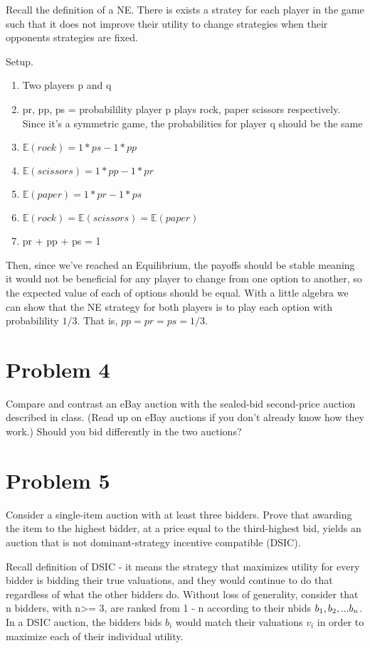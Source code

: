 \documentclass{article}
\begin{document}
Recall the definition of a NE.  There is exists a stratey for each player in
		the game such that it does not improve their utility to change
		strategies when their opponents strategies are fixed.

Setup.  
\begin{enumerate}
\item Two players p and q
\item pr, pp, ps = probabilility player p plays rock, paper scissors
	respectively.  Since it's a symmetric game, the probabilities for player q
		should be the same

\item$\mathbb{E}(rock) = 1*ps - 1*pp$
\item$\mathbb{E}(scissors) = 1*pp - 1*pr$
\item$\mathbb{E}(paper) = 1*pr - 1*ps$
\item$\mathbb{E}(rock) = \mathbb{E}(scissors) = \mathbb{E}(paper)$
\item pr + pp + ps = 1
\end{enumerate}

Then, since we've reached an Equilibrium, the payoffs should be stable meaning
it would not be beneficial for any player to change from one option to
another, so the expected value of each of options should be equal.  With a
little algebra we can show that the NE strategy for both players is to play
each option with probabilility $1/3$.  That is, $pp = pr = ps = 1/3$.

\section*{Problem 4}
Compare and contrast an eBay auction with the sealed-bid second-price auction described in class. (Read up on eBay auctions if you don’t already know how they work.) Should you bid differently in the two auctions?

\section*{Problem 5}
Consider a single-item auction with at least three bidders. Prove that awarding the item to the highest bidder, at a price equal to the third-highest bid, yields an auction that is not dominant-strategy incentive
compatible (DSIC).

Recall definition of DSIC - it means the strategy that maximizes utility for
every bidder is bidding their true valuations, and they would continue to do
that regardless of what the other bidders do.  Without loss of generality,
consider that n bidders, with n>= 3,  are ranked from 1 - n according to their
nbids $b\textsubscript{1}, b_2, ... b_n$. In a DSIC auction, the bidders bids
$b_i$ would match their valuations $v_i$ in order to maximize each of their
individual utility.  
\end{document}
